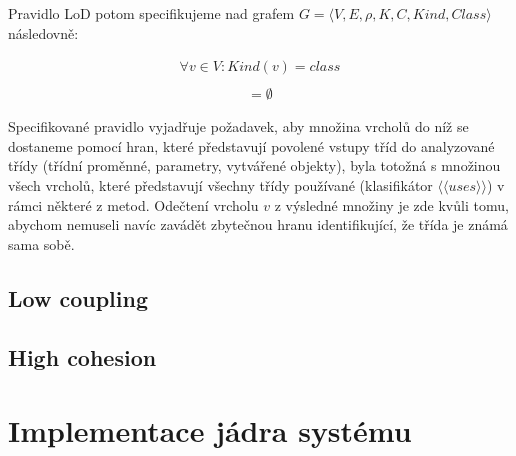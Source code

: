 Pravidlo LoD potom specifikujeme nad grafem $G = \langle V, E, \rho, K, C, \mathit{Kind}, \mathit{Class}\rangle$ následovně:

\begin{align*}
\forall v \in V: Kind(v) = class\\
\end{align*}
\begin{align*}
[((&F(G, v, class, \langle\langle{}has\_field\rangle\rangle{}) \cup F(G, v, class, \langle\langle{}has\_param\rangle\rangle{}) \cup\\
&F(G, v, class, \langle\langle{}instantiates\rangle\rangle{})) \cap F(v, class, \langle\langle{}uses\rangle\rangle{}) \setminus \{v\}] = \emptyset
\end{align*}

Specifikované pravidlo vyjadřuje požadavek, aby množina vrcholů do níž se dostaneme pomocí hran, které představují povolené vstupy tříd do analyzované třídy (třídní proměnné, parametry, vytvářené objekty), byla totožná s množinou všech vrcholů, které představují všechny třídy používané (klasifikátor $\langle\langle{}uses\rangle\rangle$) v rámci některé z metod. Odečtení vrcholu $v$ z výsledné množiny je zde kvůli tomu, abychom nemuseli navíc zavádět zbytečnou hranu identifikující, že třída je známá sama sobě.

\subsection{Low coupling}



\subsection{High cohesion}

\section{Implementace jádra systému}

